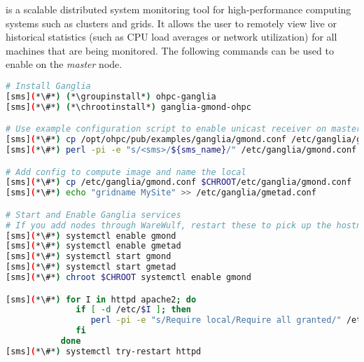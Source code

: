 \Ganglia{} is a scalable distributed system monitoring tool for high-performance
computing systems such as clusters and grids. It allows the user to remotely
view live or historical statistics (such as CPU load averages or network
utilization) for all machines that are being monitored. The following commands
can be used to enable \Ganglia{} on the {\em master} node.

\begin{lstlisting}[language=bash,keywords={},upquote=true]
# Install Ganglia
[sms](*\#*) (*\groupinstall*) ohpc-ganglia
[sms](*\#*) (*\chrootinstall*) ganglia-gmond-ohpc

# Use example configuration script to enable unicast receiver on master host
[sms](*\#*) cp /opt/ohpc/pub/examples/ganglia/gmond.conf /etc/ganglia/gmond.conf
[sms](*\#*) perl -pi -e "s/<sms>/${sms_name}/" /etc/ganglia/gmond.conf

# Add config to compute image and name the local 
[sms](*\#*) cp /etc/ganglia/gmond.conf $CHROOT/etc/ganglia/gmond.conf
[sms](*\#*) echo "gridname MySite" >> /etc/ganglia/gmetad.conf

# Start and Enable Ganglia services
# If you add nodes through WareWulf, restart these to pick up the hostnames rather than the IPs
[sms](*\#*) systemctl enable gmond
[sms](*\#*) systemctl enable gmetad
[sms](*\#*) systemctl start gmond
[sms](*\#*) systemctl start gmetad
[sms](*\#*) chroot $CHROOT systemctl enable gmond

[sms](*\#*) for I in httpd apache2; do
              if [ -d /etc/$I ]; then
                 perl -pi -e "s/Require local/Require all granted/" /etc/$I/conf.d/ganglia-ohpc.conf
              fi
           done 
[sms](*\#*) systemctl try-restart httpd
\end{lstlisting}

